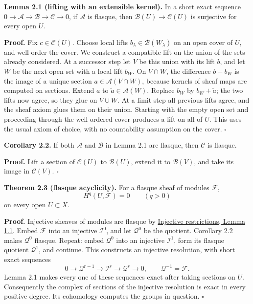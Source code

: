 \documentclass[11pt]{article}
\begin{document}
\textbf{Lemma 2.1 (lifting with an extensible kernel).} In a short exact
sequence \(0\to\mathcal A\to\mathcal B\to\mathcal C\to0\), if
\(\mathcal A\) is flasque, then \(\mathcal B(U)\to\mathcal C(U)\) is
surjective for every open \(U\).

\textbf{Proof.} Fix \(c\in\mathcal C(U)\). Choose local lifts
\(b_\lambda\in\mathcal B(W_\lambda)\) on an open cover of \(U\), and
well order the cover. We construct a compatible lift on the union of the
sets already considered. At a successor step let \(V\) be this union
with its lift \(b\), and let \(W\) be the next open set with a local
lift \(b_W\). On \(V\cap W\), the difference \(b-b_W\) is the image of a
unique section \(a\in\mathcal A(V\cap W)\), because kernels of sheaf
maps are computed on sections. Extend \(a\) to
\(\widetilde a\in\mathcal A(W)\). Replace \(b_W\) by
\(b_W+\widetilde a\); the two lifts now agree, so they glue on
\(V\cup W\). At a limit step all previous lifts agree, and the sheaf
axiom glues them on their union. Starting with the empty open set and
proceeding through the well-ordered cover produces a lift on all of
\(U\). This uses the usual axiom of choice, with no countability
assumption on the cover. \(\square\)

\textbf{Corollary 2.2.} If both \(\mathcal A\) and \(\mathcal B\) in
Lemma 2.1 are flasque, then \(\mathcal C\) is flasque.

\textbf{Proof.} Lift a section of \(\mathcal C(U)\) to
\(\mathcal B(U)\), extend it to \(\mathcal B(V)\), and take its image in
\(\mathcal C(V)\). \(\square\)

\textbf{Theorem 2.3 (flasque acyclicity).} For a flasque sheaf of
modules \(\mathcal F\), \[
H^q(U,\mathcal F)=0\qquad(q>0)
\] on every open \(U\subset X\).

\textbf{Proof.} Injective sheaves of modules are flasque by
\href{https://kokunoyumeto.github.io/open-math-courses/courses/derived-categories-and-sheaf-operations/injective-modules-and-bounded-below-derived-functors.html\#1-extending-maps-and-extending-sections}{Injective
restrictions, Lemma 1.1}. Embed \(\mathcal F\) into an injective
\(\mathcal I^0\), and let \(\mathcal Q^0\) be the quotient. Corollary
2.2 makes \(\mathcal Q^0\) flasque. Repeat: embed \(\mathcal Q^0\) into
an injective \(\mathcal I^1\), form its flasque quotient
\(\mathcal Q^1\), and continue. This constructs an injective resolution,
with short exact sequences \[
0\to\mathcal Q^{r-1}\to\mathcal I^r\to\mathcal Q^r\to0,
\qquad\mathcal Q^{-1}=\mathcal F.
\] Lemma 2.1 makes every one of these sequences exact after taking
sections on \(U\). Consequently the complex of sections of the injective
resolution is exact in every positive degree. Its cohomology computes
the groups in question. \(\square\)
\end{document}
